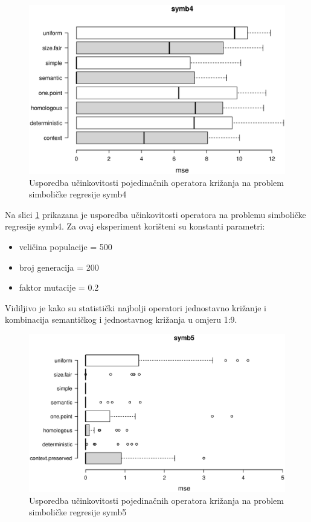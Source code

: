 \begin{figure}[H]
	\centering
	\includegraphics[trim=0cm 4cm 0cm 0cm, scale=0.6]{./slike/boxPlots/symb4.eps}
	\caption{Usporedba učinkovitosti pojedinačnih operatora križanja na problem simboličke regresije symb4}
	\label{symb4box}
\end{figure}

Na slici \ref{symb4box} prikazana je usporedba učinkovitosti operatora na problemu simboličke regresije symb4. Za ovaj eksperiment korišteni su konstanti parametri:
\begin{itemize}
\item{veličina populacije = 500}
\item{broj generacija = 200}
\item{faktor mutacije = 0.2}
\end{itemize} 

Vidiljivo je kako su statistički najbolji operatori jednostavno križanje i kombinacija semantičkog i jednostavnog križanja u omjeru 1:9. 


\begin{figure}[H]
	\centering
	\includegraphics[trim=0cm 4cm 0cm 0cm, scale=0.6]{./slike/boxPlots/symb5.eps}
	\caption{Usporedba učinkovitosti pojedinačnih operatora križanja na problem simboličke regresije symb5}
	\label{symb5box}
\end{figure}


